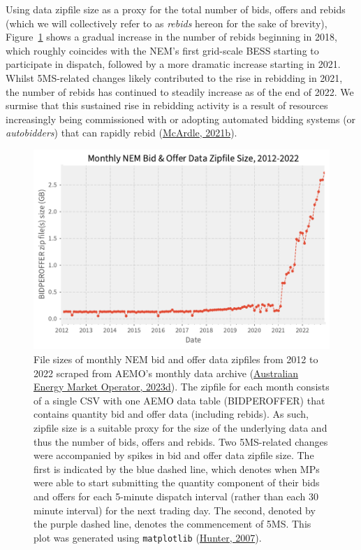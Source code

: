 \documentclass[12pt,a4paper,]{report}
\begin{document}
Using data zipfile size as a proxy for the total number of bids, offers
and rebids (which we will collectively refer to as \emph{rebids} hereon
for the sake of brevity), Figure~\ref{fig:bid_file_size_2012_2022} shows
a gradual increase in the number of rebids beginning in 2018, which
roughly coincides with the NEM's first grid-scale BESS starting to
participate in dispatch, followed by a more dramatic increase starting
in 2021. Whilst 5MS-related changes likely contributed to the rise in
rebidding in 2021, the number of rebids has continued to steadily
increase as of the end of 2022. We surmise that this sustained rise in
rebidding activity is a result of resources increasingly being
commissioned with or adopting automated bidding systems (or
\emph{autobidders}) that can rapidly rebid
(\protect\hyperlink{ref-mcardleRiseAutobidder2021}{McArdle, 2021b}).

\begin{figure}
\hypertarget{fig:bid_file_size_2012_2022}{%
\centering
\includegraphics{source/figures/monthly_bidding_data_size_2012_2023.pdf}
\caption[Monthly NEM bid and offer data zipfile size from 2012 to
2022]{File sizes of monthly NEM bid and offer data zipfiles from 2012 to
2022 scraped from AEMO's monthly data archive
(\protect\hyperlink{ref-australianenergymarketoperatorElectricityDataModel2023}{Australian
Energy Market Operator, 2023d}). The zipfile for each month consists of
a single CSV with one AEMO data table (BIDPEROFFER) that contains
quantity bid and offer data (including rebids). As such, zipfile size is
a suitable proxy for the size of the underlying data and thus the number
of bids, offers and rebids. Two 5MS-related changes were accompanied by
spikes in bid and offer data zipfile size. The first is indicated by the
blue dashed line, which denotes when MPs were able to start submitting
the quantity component of their bids and offers for each 5-minute
dispatch interval (rather than each 30 minute interval) for the next
trading day. The second, denoted by the purple dashed line, denotes the
commencement of 5MS. This plot was generated using \texttt{matplotlib}
(\protect\hyperlink{ref-hunterMatplotlib2DGraphics2007}{Hunter,
2007}).}\label{fig:bid_file_size_2012_2022}
}
\end{figure}
\end{document}
